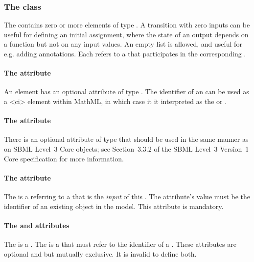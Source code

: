 
\subsubsection{The  class}
The \ListOfInputs contains zero or more elements of type \Input. A transition with zero inputs can be useful for defining an initial assignment, where the state of an output depends on a function but not on any input values. An empty list is allowed, and useful for e.g. adding annotations.
Each \Input refers to a \QualitativeSpecies that participates in the corresponding \Transition.

\paragraph{The  attribute}
An \Input element has an optional  attribute of type . The identifier of an \Input can be used as a 
<ci> element within MathML, in which case it it interpreted as the  or .

\paragraph{The  attribute}
There is an optional  attribute of type  that should be used
in the same manner as on SBML Level~3 Core
objects; see Section~3.3.2 of the SBML Level~3 Version~1 Core
specification for more information.


\paragraph{The  attribute}
The  is a  referring to a \QualitativeSpecies that is the \emph{input} of this \Transition. The attribute's value must be the identifier of an existing \QualitativeSpecies object in the model. This attribute is mandatory.

\paragraph{The  and  attributes}
The  is a . The  is a  that must refer to the identifier of a \SymbolicValue. These attributes are optional and but mutually exclusive. It is invalid to define both.

